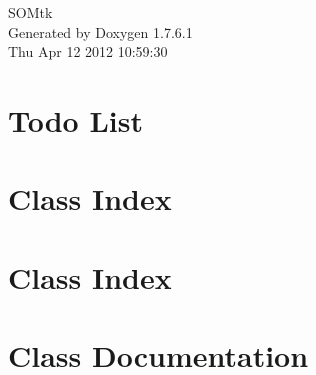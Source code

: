 \documentclass[a4paper]{book}
\begin{document}
\hypersetup{pageanchor=false,citecolor=blue}
\begin{titlepage}
\vspace*{7cm}
\begin{center}
{\Large \-S\-O\-Mtk }\\
\vspace*{1cm}
{\large \-Generated by Doxygen 1.7.6.1}\\
\vspace*{0.5cm}
{\small Thu Apr 12 2012 10:59:30}\\
\end{center}
\end{titlepage}
\clearemptydoublepage
{}
\tableofcontents
\clearemptydoublepage
{}
\hypersetup{pageanchor=true,citecolor=blue}
\chapter{\-Todo \-List}
\label{todo}
\hypertarget{todo}{}

\chapter{\-Class \-Index}

\chapter{\-Class \-Index}

\chapter{\-Class \-Documentation}

















\printindex
\end{document}
